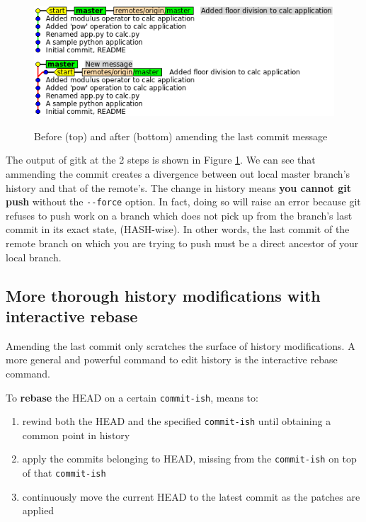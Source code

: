 \documentclass[a4paper]{../../common/tufte-latex/tufte-handout}
\begin{document}
\begin{figure}%
  \centering
  \includegraphics[width=0.85\linewidth]{gitcommit-amend.png}
  \label{fig:gitcommit-amend}
  \caption{Before (top) and after (bottom) amending the last commit message}
\end{figure}

The output of gitk at the 2 steps is shown in Figure \ref{fig:gitcommit-amend}.
We can see that ammending the commit creates a divergence between out local master branch's history and that of the remote's.
The change in history means \textbf{you cannot git push} without the \texttt{-{}-force} option. 
In fact, doing so will raise an error because git refuses to push work on a branch which does not pick up from the branch's last commit in its exact state, (HASH-wise).
In other words, the last commit of the remote branch on which you are trying to push must be a direct ancestor of your local branch.

\subsection{More thorough history modifications with interactive rebase}
Amending the last commit only scratches the surface of history modifications.
A more general and powerful command to edit history is the interactive rebase command.

To \textbf{rebase} the HEAD on a certain \texttt{commit-ish}, means to:

\begin{enumerate} 
 \item{rewind both the HEAD and the specified \texttt{commit-ish} until obtaining a common point in history}
 \item{apply the commits belonging to HEAD, missing from the \texttt{commit-ish} on top of that \texttt{commit-ish}}
 \item{continuously move the current HEAD to the latest commit as the patches are applied}
\end{enumerate}
\end{document}
